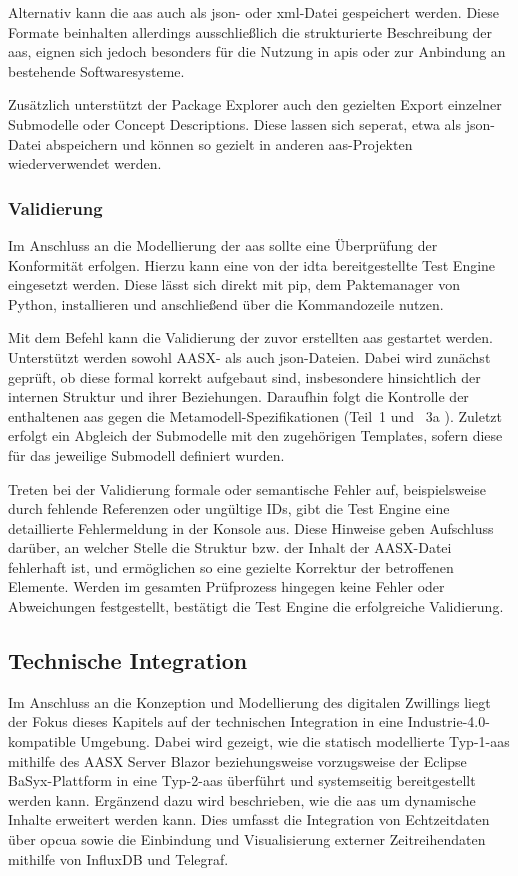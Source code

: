 Alternativ kann die \acs{aas} auch als \ac{json}- oder \ac{xml}-Datei gespeichert werden.
Diese Formate beinhalten allerdings ausschließlich die strukturierte Beschreibung der \acs{aas}, eignen sich jedoch besonders für die Nutzung in \acsp{api} oder zur Anbindung an bestehende Softwaresysteme.

Zusätzlich unterstützt der Package Explorer auch den gezielten Export einzelner Submodelle oder Concept Descriptions.
Diese lassen sich seperat, etwa als \acs{json}-Datei abspeichern und können so gezielt in anderen \acs{aas}-Projekten wiederverwendet werden.

\subsubsection{Validierung}
Im Anschluss an die Modellierung der \acs{aas} sollte eine Überprüfung der Konformität erfolgen.
Hierzu kann eine von der \acs{idta} bereitgestellte Test Engine \cite{TestEngine} eingesetzt werden. 
Diese lässt sich direkt mit pip, dem Paktemanager von Python, installieren und anschließend über die Kommandozeile nutzen.

Mit dem Befehl 
kann die Validierung der zuvor erstellten \acs{aas} gestartet werden.
Unterstützt werden sowohl AASX- als auch \acs{json}-Dateien.
Dabei wird zunächst geprüft, ob diese formal korrekt aufgebaut sind, insbesondere hinsichtlich der internen Struktur und ihrer Beziehungen.
Daraufhin folgt die Kontrolle der enthaltenen \acs{aas} gegen die Metamodell-Spezifikationen (Teil~1 \cite{SpezifikationPart1} und%
\pagebreak 
~3a \cite{SpezifikationPart3a}).
Zuletzt erfolgt ein Abgleich der Submodelle mit den zugehörigen Templates, sofern diese für das jeweilige Submodell definiert wurden.

Treten bei der Validierung formale oder semantische Fehler auf, beispielsweise durch fehlende Referenzen oder ungültige IDs, gibt die Test Engine eine detaillierte Fehlermeldung in der Konsole aus. 
Diese Hinweise geben Aufschluss darüber, an welcher Stelle die Struktur bzw. der Inhalt der AASX-Datei fehlerhaft ist, und ermöglichen so eine gezielte Korrektur der betroffenen Elemente. 
Werden im gesamten Prüfprozess hingegen keine Fehler oder Abweichungen festgestellt, bestätigt die Test Engine die erfolgreiche Validierung.

\subsection{Technische Integration}
Im Anschluss an die Konzeption und Modellierung des digitalen Zwillings liegt der Fokus dieses Kapitels auf der technischen Integration in eine Industrie-4.0-kompatible Umgebung.
Dabei wird gezeigt, wie die statisch modellierte Typ-1-\acs{aas} mithilfe des AASX Server Blazor beziehungsweise vorzugsweise der Eclipse BaSyx-Plattform in eine Typ-2-\acs{aas} überführt und systemseitig bereitgestellt werden kann.
Ergänzend dazu wird beschrieben, wie die \acs{aas} um dynamische Inhalte erweitert werden kann.
Dies umfasst die Integration von Echtzeitdaten über \acs{opcua} sowie die Einbindung und Visualisierung externer Zeitreihendaten mithilfe von InfluxDB und Telegraf.

